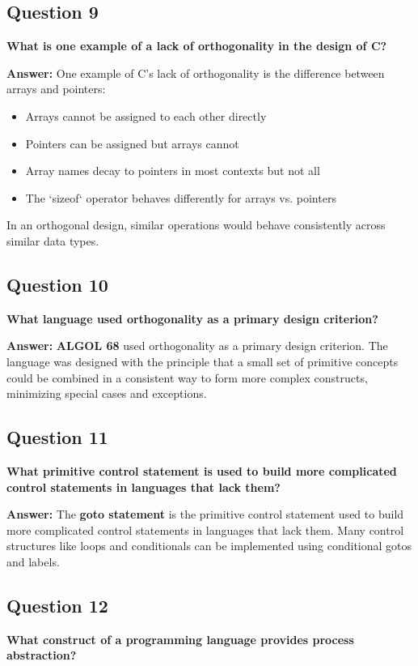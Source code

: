 \documentclass[11pt,a4paper]{article}
\begin{document}
\subsection{Question 9}
\textbf{What is one example of a lack of orthogonality in the design of C?}

\textbf{Answer:}
One example of C's lack of orthogonality is the difference between arrays and pointers:

\begin{itemize}
\item Arrays cannot be assigned to each other directly
\item Pointers can be assigned but arrays cannot
\item Array names decay to pointers in most contexts but not all
\item The `sizeof` operator behaves differently for arrays vs. pointers
\end{itemize}

In an orthogonal design, similar operations would behave consistently across similar data types.

\subsection{Question 10}
\textbf{What language used orthogonality as a primary design criterion?}

\textbf{Answer:}
\textbf{ALGOL 68} used orthogonality as a primary design criterion. The language was designed with the principle that a small set of primitive concepts could be combined in a consistent way to form more complex constructs, minimizing special cases and exceptions.

\subsection{Question 11}
\textbf{What primitive control statement is used to build more complicated control statements in languages that lack them?}

\textbf{Answer:}
The \textbf{goto statement} is the primitive control statement used to build more complicated control statements in languages that lack them. Many control structures like loops and conditionals can be implemented using conditional gotos and labels.

\subsection{Question 12}
\textbf{What construct of a programming language provides process abstraction?}
\end{document}
